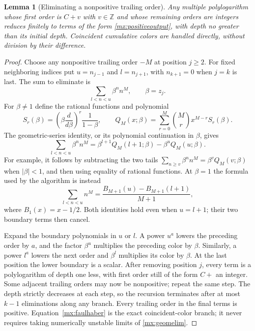 \documentclass[11pt]{article}
\numberwithin{equation}{section}
\newtheorem{lemma}[theorem]{Lemma}
\theoremstyle{definition}
\theoremstyle{remark}
\begin{document}
\begin{lemma}[Eliminating a nonpositive trailing order]
\label{mx:eliminate}
Any multiple polylogarithm whose first order is $C+v$ with
$v\in\mathbb Z$ and whose remaining orders are integers reduces
finitely to terms of the form \eqref{mx:positiveoutput}, with depth
no greater than its initial depth.  Coincident cumulative colors are
handled directly, without division by their difference.
\end{lemma}

\begin{proof}
Choose any nonpositive trailing order $-M$ at position $j\geq2$.
For fixed neighboring indices put
$u=n_{j-1}$ and $l=n_{j+1}$, with $n_{k+1}=0$ when $j=k$ is last.
The sum to eliminate is
\[
 \sum_{l<n<u}\beta^n n^M,\qquad \beta=z_j.
\]
For $\beta\ne1$ define the rational functions and polynomial
\begin{equation}\label{mx:Q}
 S_r(\beta)=\left(\beta\frac d{d\beta}\right)^r
                         \frac1{1-\beta},\qquad
 Q_M(x;\beta)=\sum_{r=0}^M\binom Mr x^{M-r}S_r(\beta).
\end{equation}
The geometric-series identity, or its polynomial continuation in
$\beta$, gives
\begin{equation}\label{mx:geomelim}
 \sum_{l<n<u}\beta^n n^M
   =\beta^{l+1}Q_M(l+1;\beta)-\beta^uQ_M(u;\beta).
\end{equation}
For example, it follows by subtracting the two tails
$\sum_{n\geq v}\beta^n n^M=\beta^vQ_M(v;\beta)$ when
$|\beta|<1$, and then using equality of rational functions.  At
$\beta=1$ the formula used by the algorithm is instead
\begin{equation}\label{mx:faulhaber}
 \sum_{l<n<u}n^M
   =\frac{B_{M+1}(u)-B_{M+1}(l+1)}{M+1},
\end{equation}
where $B_1(x)=x-1/2$.  Both identities hold even when $u=l+1$;
their two boundary terms then cancel.

Expand the boundary polynomials in $u$ or $l$.  A power $u^a$ lowers
the preceding order by $a$, and the factor $\beta^u$ multiplies the
preceding color by $\beta$.  Similarly, a power $l^a$ lowers the next
order and $\beta^l$ multiplies its color by $\beta$.  At the last
position the lower boundary is a scalar.  After removing position
$j$, every term is a polylogarithm of depth one less, with first order
still of the form $C+$ an integer.  Some adjacent trailing orders
may now be nonpositive; repeat the same step.  The depth strictly
decreases at each step, so the recursion terminates after at most
$k-1$ eliminations along any branch.  Every trailing order in the
final terms is positive.  Equation~\eqref{mx:faulhaber} is the exact
coincident-color branch; it never requires taking numerically unstable
limits of \eqref{mx:geomelim}.
\end{proof}
\end{document}
